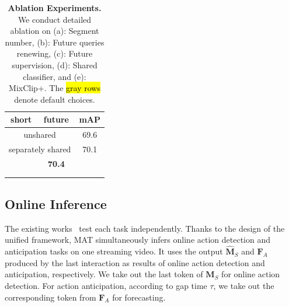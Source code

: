 \begin{table}[t]
{{    \begin{tabular}[t]{ccc}
        short & future & mAP \\
         \midrule
          \multicolumn{2}{c}{unshared} & 69.6 \\
          \multicolumn{2}{c}{separately shared} & 70.1 \\
         \rowcolor{light}
          \multicolumn{2}{c}{full shared} & \textbf{70.4}\\
          \\
         
    \\
    \end{tabular}}}
    \hspace{1.5mm}
    \caption{\textbf{Ablation Experiments.} We conduct detailed ablation on (a): Segment number, (b): Future queries renewing, (c): Future supervision, (d): Shared classifier, and (e): MixClip+. The \hl{gray rows} denote default choices.}
\end{table}

\subsection{Online Inference}
The existing works~\cite{trn, colar, lstr, testra, avt} test each task independently. 
Thanks to the design of the unified framework, MAT simultaneously infers online action detection and anticipation tasks on one streaming video. It uses the output  $\mathbf{\widehat{M}}_S$ and $ \mathbf{F}_A$ produced by the last interaction as results of online action detection and anticipation, respectively. We take out the last token of $\mathbf{\widehat{M}}_S$ for online action detection. For action anticipation, according to gap time $ \tau$, we take out the corresponding token from $ \mathbf{F}_A$ for forecasting.

